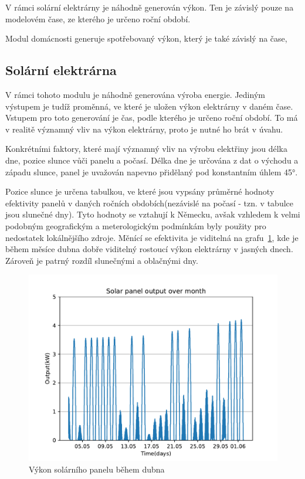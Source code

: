 \documentclass[12pt,a4paper]{article}
\begin{document}
V rámci solární elektrárny je náhodně generován výkon.
Ten je závislý pouze na modelovém čase, ze kterého je určeno roční období.

Modul domácnosti generuje spotřebovaný výkon, který je také závislý na čase,


\subsection{Solární elektrárna}
V rámci tohoto modulu je náhodně generována výroba energie.
Jediným výstupem je tudíž proměnná, ve které je uložen výkon elektrárny v daném čase.
Vstupem pro toto generování je čas, podle kterého je určeno roční období.
To má v realitě významný vliv na výkon elektrárny, proto je nutné ho brát v úvahu.

Konkrétními faktory, které mají významný vliv na výrobu elektřiny jsou délka dne, pozice slunce vůči panelu a počasí.
Délka dne je určována z dat o východu a západu slunce, panel je uvažován napevno přidělaný pod konstantním úhlem 45°.

Pozice slunce je určena tabulkou, ve které jsou vypsány průměrné hodnoty efektivity panelů v daných ročních obdobích(nezávislé na počasí - tzn. v tabulce jsou slunečné dny). Tyto hodnoty se vztahují k Německu, avšak vzhledem k velmi podobným geografickým a meterologickým podmínkám byly použity pro nedostatek lokálnějšího zdroje. Měnící se efektivita je viditelná na grafu~\ref{fig:solar_month}, kde je během měsíce dubna dobře viditelný rostoucí výkon elektrárny v jasných dnech. Zároveň je patrný rozdíl slunečnými a oblačnými dny.\cite{Paul-Frederik_Bach}

\begin{figure}
\includegraphics[width=\linewidth]{img/solar_month.pdf}
\caption{Výkon solárního panelu během dubna}
\label{fig:solar_month}
\end{figure}
\end{document}
